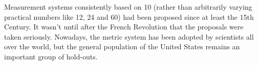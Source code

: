 \documentclass[12pt]{article}
\begin{document}
Measurement systems consistently based on 10 (rather than arbitrarily varying practical numbers like 12, 24 and 60) had been proposed since at least the 15th Century. It wasn't until after the French Revolution that the proposals were taken seriously. Nowadays, the metric system has been adopted by scientists all over the world, but the general population of the United States remains an important group of hold-outs.
\end{document}
